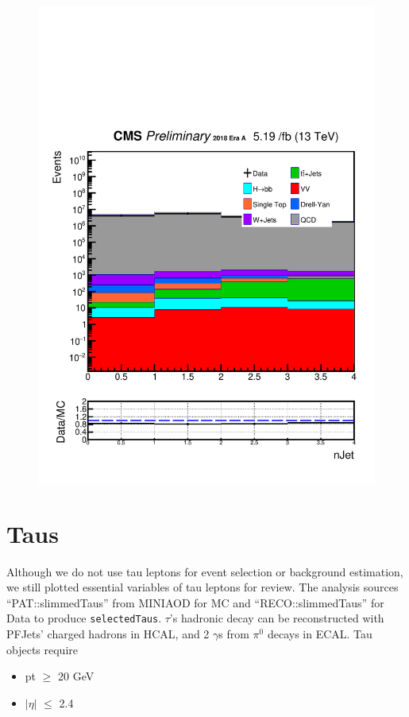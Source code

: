\begin{figure}[h!]
  \includegraphics[width=0.47\linewidth]{figs/Data_log_AnalysisNote_MS-15_ctauS-10_nJet.pdf}
\end{figure}

\section{Taus}\label{sec:taus}
Although we do not use tau leptons for event selection or background estimation, we still plotted essential variables of tau leptons for review.
The analysis sources ``PAT::slimmedTaus'' from MINIAOD for MC and ``RECO::slimmedTaus'' for Data to produce {\tt selectedTaus}.
$\tau$'s hadronic decay can be reconstructed with PFJets' charged hadrons in HCAL, and 2 $\gamma$s from $\pi^{0}$ decays in ECAL.
Tau objects require
\begin{itemize}
  \item pt $\geq$ 20 GeV
  \item $|\eta|$ $\leq$ 2.4
\end{itemize}

